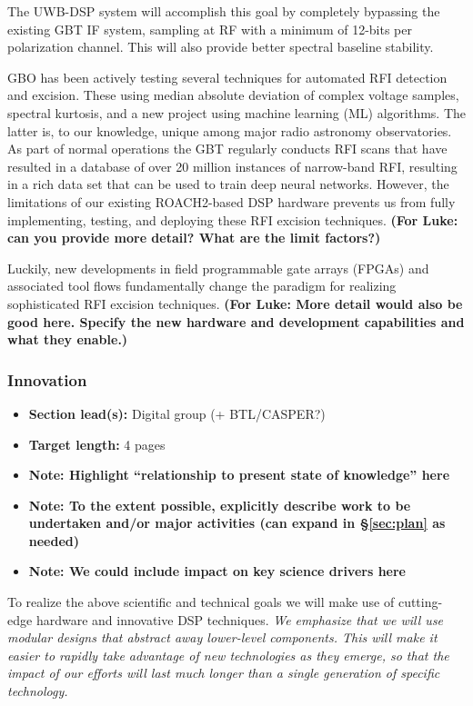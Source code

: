 \documentclass[10pt]{myNSF}
\begin{document}
The UWB-DSP system will accomplish this goal by completely bypassing
the existing GBT IF system, sampling at RF with a minimum of 12-bits
per polarization channel.  This will also provide better spectral
baseline stability.

 GBO has been actively testing several
techniques for automated RFI detection and excision.  These using
median absolute deviation of complex voltage samples, spectral
kurtosis, and a new project using machine learning (ML) algorithms.
The latter is, to our knowledge, unique among major radio astronomy
observatories.  As part of normal operations the GBT regularly
conducts RFI scans that have resulted in a database of over 20 million
instances of narrow-band RFI, resulting in a rich data set that can be
used to train deep neural networks.  However, the limitations of our
existing ROACH2-based DSP hardware prevents us from fully
implementing, testing, and deploying these RFI excision techniques.
\textbf{(For Luke: can you provide more detail?  What are the limit
  factors?)}

Luckily, new developments in field programmable gate arrays (FPGAs) and
associated tool flows fundamentally change the paradigm for realizing
sophisticated RFI excision techniques.  \textbf{(For Luke: More detail
  would also be good here.  Specify the new hardware and development
  capabilities and what they enable.)}

\subsubsection{Innovation}
\label{sec:innovation}

\begin{itemize}
\item{\textbf{Section lead(s):} Digital group (+ BTL/CASPER?)}
\item{\textbf{Target length:} 4 pages}
\item{\textbf{Note: Highlight ``relationship to present state of
      knowledge'' here}}
\item{\textbf{Note: To the extent possible, explicitly describe work
      to be undertaken and/or major activities (can expand in
      \S\ref{sec:plan} as needed)}}
\item{\textbf{Note: We could include impact on key science drivers
      here}}
\end{itemize}

To realize the above scientific and technical goals we will make use
of cutting-edge hardware and innovative DSP techniques.  \emph{We
  emphasize that we will use modular designs that abstract away
  lower-level components.  This will make it easier to rapidly take
  advantage of new technologies as they emerge, so that the impact of
  our efforts will last much longer than a single generation of
  specific technology.}
\end{document}
